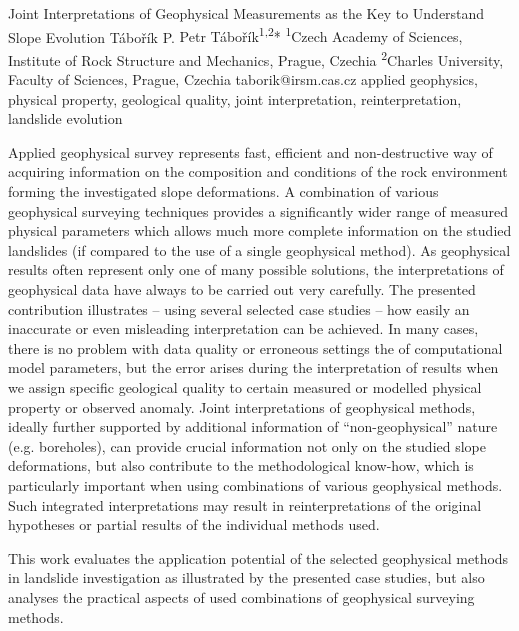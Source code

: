 \abstract
{Joint Interpretations of Geophysical Measurements as the Key to Understand Slope Evolution} 
{Tábořík P.} 
{Petr Tábořík\textsuperscript{1,2}*} 
{\POtag} 
{
	\textsuperscript{1}Czech Academy of Sciences, Institute of Rock Structure and Mechanics, Prague, Czechia
	\textsuperscript{2}Charles University, Faculty of Sciences, Prague, Czechia
}
{taborik@irsm.cas.cz}  %
{applied geophysics, physical property, geological quality, joint interpretation, reinterpretation, landslide evolution}
{Applied geophysical survey represents fast, efficient and non-destructive way of acquiring information on the composition and conditions of the rock environment forming the investigated slope deformations. A combination of various geophysical surveying techniques provides a significantly wider range of measured physical parameters which allows much more complete information on the studied landslides (if compared to the use of a single geophysical method). As geophysical results often represent only one of many possible solutions, the interpretations of geophysical data have always to be carried out very carefully. The presented contribution illustrates -- using several selected case studies -- how easily an inaccurate or even misleading interpretation can be achieved. In many cases, there is no problem with data quality or erroneous settings the of computational model parameters, but the error arises during the interpretation of results when we assign specific geological quality to certain measured or modelled physical property or observed anomaly. Joint interpretations of geophysical methods, ideally further supported by additional information of \enquote{non-geophysical} nature (e.g. boreholes), can provide crucial information not only on the studied slope deformations, but also contribute to the methodological know-how, which is particularly important when using combinations of various geophysical methods. Such integrated interpretations may result in reinterpretations of the original hypotheses or partial results of the individual methods used.

This work evaluates the application potential of the selected geophysical methods in landslide investigation as illustrated by the presented case studies, but also analyses the practical aspects of used combinations of geophysical surveying methods. 
}
{
}


